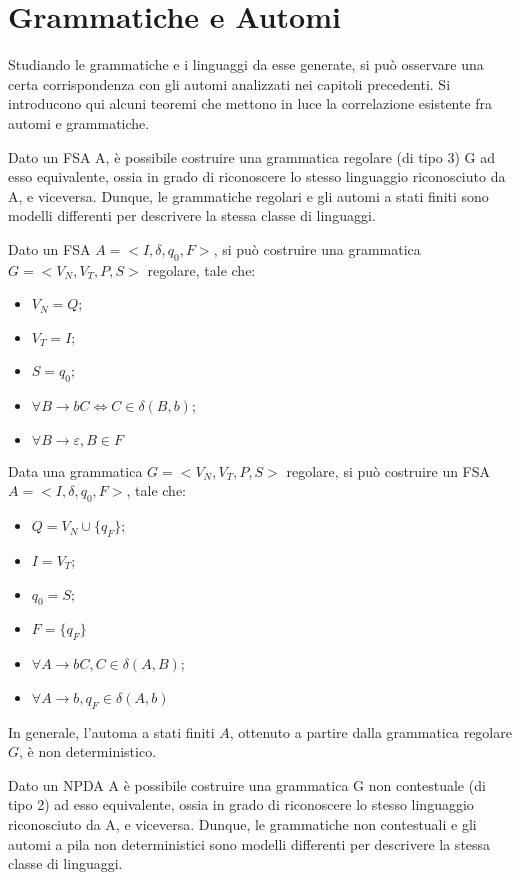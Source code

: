   \section{Grammatiche e Automi}
  Studiando le grammatiche e i linguaggi da esse generate, si può osservare una certa corrispondenza con gli automi analizzati nei capitoli precedenti. Si introducono qui alcuni teoremi che mettono in luce la correlazione esistente fra automi e grammatiche.

  \begin{theorem}
    Dato un FSA A, è possibile costruire una grammatica regolare (di tipo 3) G ad esso equivalente, ossia in grado di riconoscere lo stesso linguaggio riconosciuto da A, e viceversa. Dunque, le grammatiche regolari e gli automi a stati finiti sono modelli differenti per descrivere la stessa classe di linguaggi. 
  \end{theorem}
  Dato un FSA \(A=<I, \delta, q_0, F>\), si può costruire una grammatica \(G=<V_N,V_T, P, S>\) regolare, tale che:
  \begin{itemize}
    \item \(V_N=Q\);
    \item \(V_T=I\);
    \item \(S=q_0\);
    \item \(\forall B\to bC\iff C\in\delta(B,b)\);
    \item \(\forall B\to\varepsilon, B\in F\)
  \end{itemize}
  Data una grammatica \(G=<V_N, V_T, P, S>\) regolare, si può costruire un FSA \(A=<I, \delta, q_0, F>\), tale che:
  \begin{itemize}
    \item \(Q=V_N\cup\{q_F\}\);
    \item \(I=V_T\);
    \item \(q_0=S\);
    \item \(F=\{q_F\}\)
    \item \(\forall A\to bC, C\in \delta(A,B)\);
    \item \(\forall A\to b, q_F\in\delta(A,b)\)
  \end{itemize}

  In generale, l'automa a stati finiti \(A\), ottenuto a partire dalla grammatica regolare \(G\), è non deterministico.

  \begin{theorem}
    Dato un NPDA A è possibile costruire una grammatica G non contestuale (di tipo 2) ad esso equivalente, ossia in grado di riconoscere lo stesso linguaggio riconosciuto da A, e viceversa. Dunque, le grammatiche non contestuali e gli automi a pila non deterministici sono modelli differenti per descrivere la stessa classe di linguaggi.
  \end{theorem}

